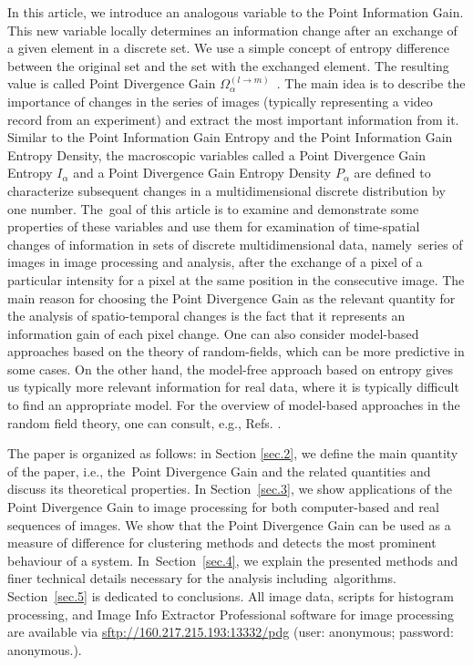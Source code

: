 \documentclass[entropy,article,accept,moreauthors,pdftex,10pt,a4paper]{mdpi}
\begin{document}
In this article, we introduce an analogous variable to the Point Information Gain. This new variable locally determines an information change after an exchange of a given element in a discrete set. We use a simple concept of entropy difference between the original set and the set with the exchanged element. The resulting value is called {Point Divergence Gain} $\Omega_\alpha^{(l \rightarrow m)}$~\cite{Ryc15,Ryc16c}. The main idea is to describe the importance of changes in the series of images (typically representing a video record from an experiment) and extract the most important information from it. Similar to the Point Information Gain Entropy and the Point Information Gain Entropy Density, the macroscopic variables called a Point Divergence Gain Entropy $I_{\alpha}$ and a Point Divergence Gain Entropy Density $P_{\alpha}$ are defined to characterize subsequent changes in a multidimensional discrete distribution by one number. The~goal of this article is to examine and demonstrate some properties of these variables and use them for examination of time-spatial changes of information in sets of discrete multidimensional data, namely~series of images in image processing and analysis, after the exchange of a pixel of a particular intensity for a pixel at the same position in the consecutive image. The main reason for choosing the {Point Divergence Gain} as the relevant quantity for the analysis of spatio-temporal changes is the fact that it represents an information gain of each pixel change. One can also consider model-based approaches based on the theory of random-fields, which can be more predictive in some cases. On the other hand, the model-free approach based on entropy gives us typically more relevant information for real data,
where it is typically difficult to find an appropriate model.
For the overview of model-based approaches in the random field theory, one can consult, e.g., Refs. \cite{chev,eid,helle}.

The paper is organized as follows: in Section \ref{sec.2}, we define the main quantity of the paper, i.e., the~Point Divergence Gain and the related quantities and discuss its theoretical properties. In Section~\ref{sec.3}, we show applications of the Point Divergence Gain to image processing for both computer-based and real sequences of images. We show that the Point Divergence Gain can be used as a measure of difference for clustering methods and detects the most prominent behaviour of a system. In~Section~\ref{sec.4}, we explain the presented methods and finer technical details necessary for the analysis including~algorithms. Section~\ref{sec.5} is dedicated to conclusions. {All image data, scripts for histogram processing}, and Image Info Extractor Professional software for image processing are available via \url{sftp://160.217.215.193:13332/pdg} (user: anonymous; password: anonymous.).
\end{document}
